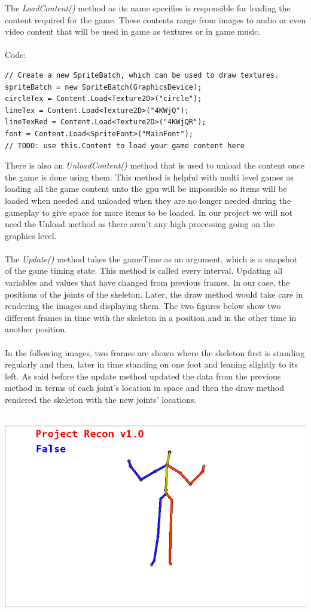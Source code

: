 The \emph{LoadContent()} method as its name specifies is responsible for loading the content required for the game. These contents range from images to audio or even video content that will be used in game as textures or in game music.
\\
\\
Code:
\begin{verbatim}
// Create a new SpriteBatch, which can be used to draw textures.
spriteBatch = new SpriteBatch(GraphicsDevice);
circleTex = Content.Load<Texture2D>("circle");
lineTex = Content.Load<Texture2D>("4KWjQ");
lineTexRed = Content.Load<Texture2D>("4KWjQR");
font = Content.Load<SpriteFont>("MainFont");
// TODO: use this.Content to load your game content here
\end{verbatim}
There is also an \emph{UnloadContent()} method that is used to unload the content once the game is done using them. This method is helpful with multi level games as loading all the game content unto the gpu will be impossible so items will be loaded when needed and unloaded when they are no longer needed during the gameplay to give space for more items to be loaded. In our project we will not need the Unload method as there aren't any high processing going on the graphics level.
\\
\\
The \emph{Update()} method takes the gameTime as an argument, which is a snapshot of the game timing state. This method is called every interval. Updating all variables and values that have changed from previous frames. In our case, the positions of the joints of the skeleton. Later, the draw method would take care in rendering the images and displaying them. The two figures below show two different frames in time with the skeleton in a position and in the other time in another position.
\\
\\
In the following images, two frames are shown where the skeleton first is standing regularly and then, later in time standing on one foot and leaning slightly to its left. As said before the update method updated the data from the previous method in terms of each joint's location in space and then the draw method rendered the skeleton with the new joints' locations.
\\
\\
\centerline{\includegraphics[scale=0.5]{skeleton_frame1.png}}
